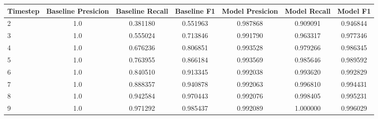 \begin{tabular}{lcccccc}
\toprule
 Timestep &  Baseline Presicion &  Baseline Recall &  Baseline F1 &  Model Presicion &  Model Recall &  Model F1 \\
\midrule
        2 &                 1.0 &         0.381180 &     0.551963 &         0.987868 &      0.909091 &  0.946844 \\
        3 &                 1.0 &         0.555024 &     0.713846 &         0.991790 &      0.963317 &  0.977346 \\
        4 &                 1.0 &         0.676236 &     0.806851 &         0.993528 &      0.979266 &  0.986345 \\
        5 &                 1.0 &         0.763955 &     0.866184 &         0.993569 &      0.985646 &  0.989592 \\
        6 &                 1.0 &         0.840510 &     0.913345 &         0.992038 &      0.993620 &  0.992829 \\
        7 &                 1.0 &         0.888357 &     0.940878 &         0.992063 &      0.996810 &  0.994431 \\
        8 &                 1.0 &         0.942584 &     0.970443 &         0.992076 &      0.998405 &  0.995231 \\
        9 &                 1.0 &         0.971292 &     0.985437 &         0.992089 &      1.000000 &  0.996029 \\
\bottomrule
\end{tabular}
